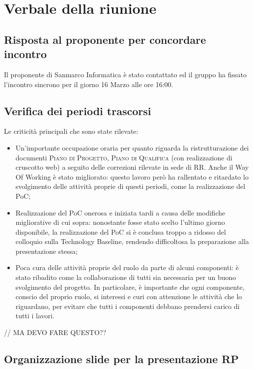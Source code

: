 \section{Verbale della riunione}

\subsection{Risposta al proponente per concordare incontro}

Il proponente di Sanmarco Informatica è stato contattato ed il gruppo ha fissato l'incontro sincrono per il giorno 16 Marzo alle ore 16:00.


\subsection{Verifica dei periodi trascorsi}

Le criticità principali che sono state rilevate:
\begin{itemize}
	\item Un'importante occupazione oraria per quanto riguarda la ristrutturazione dei documenti \textsc{Piano di Progetto}, \textsc{Piano di Qualifica} (con realizzazione di cruscotto web) a seguito delle correzioni rilevate in sede di RR. Anche il Way Of Working è stato migliorato: questo lavoro però ha rallentato e ritardato lo svolgimento delle attività proprie di questi periodi, come la realizzazione del PoC;
	\item Realizzazione del PoC onerosa e iniziata tardi a causa delle modifiche migliorative di cui sopra: nonostante fosse stato scelto l'ultimo giorno disponibile, la realizzazione del PoC si è conclusa troppo a ridosso del colloquio sulla Technology Baseline, rendendo difficoltosa la preparazione alla presentazione stessa;
	\item Poca cura delle attività proprie del ruolo da parte di alcuni componenti: è stato ribadito come la collaborazione di tutti sia necessaria per un buono svolgimento del progetto. In particolare, è importante che ogni componente, conscio del proprio ruolo, si interessi e curi con attenzione le attività che lo riguardano, per evitare che tutti i componenti debbano prendersi carico di tutti i lavori. 
\end{itemize}


// MA DEVO FARE QUESTO??

\subsection{Organizzazione slide per la presentazione RP}

